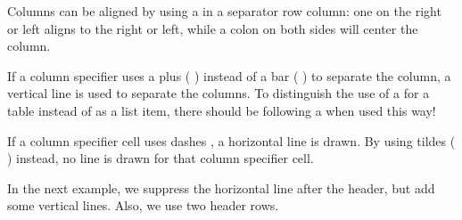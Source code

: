 \documentclass{book}
\begin{document}
\begin{mdUl}[class={list-star,compact},data-line={1042}]%
\begin{mdLi}[data-line={1042}]%
{}Columns can be aligned by using a %
{}\mdCode[class={code,code1}]{:}%
{} in a separator row column: one on the
  right or left aligns to the right or left, while a colon on both sides will
  center the column.%
\end{mdLi}%
\begin{mdLi}[data-line={1045}]%
{}If a column specifier uses a plus (%
{}\mdCode[class={code,code1}]{+}%
{}) instead of a bar (%
{}\mdCode[class={code,code1}]{{\textbar}}%
{}) to separate
  the column, a vertical line is used to separate the columns. To distinguish
  the use of a %
{}\mdCode[class={code,code1}]{+}%
{} for a table instead of as a list item, there should be
{}%
{} following a %
{}\mdCode[class={code,code1}]{+}%
{} when used this way!%
\end{mdLi}%
\begin{mdLi}[data-line={1049}]%
{}If a column specifier cell uses dashes %
{}\mdCode[class={code,code1}]{-}%
{}, a horizontal line is drawn. By using
  tildes (%
{}\mdCode[class={code,code1}]{{\textasciitilde}}%
{}) instead, no line is drawn for that column specifier cell.%
{} %
{}%
\end{mdLi}%
\end{mdUl}%
\begin{mdP}[data-line={1052}]%
{}In the next example, we suppress the horizontal line after the header, but add 
some vertical lines. Also, we use two header rows.%
\end{mdP}%
\end{document}
